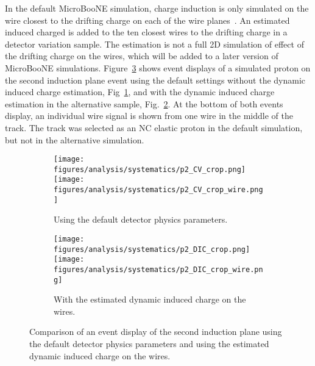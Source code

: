     In the default MicroBooNE simulation, charge induction is only simulated on
    the wire closest to the drifting charge on each of the wire
    planes~\cite{Adams:2018dra}.  An estimated induced charged is added to the
    ten closest wires to the drifting charge in a detector variation sample.
    The estimation is not a full 2D simulation of effect of the drifting charge
    on the wires, which will be added to a later version of MicroBooNE
    simulations. Figure~\ref{fig:dicevd} shows event displays of a simulated
    proton on the second induction plane event using the default settings
    without the dynamic induced charge estimation, Fig~\ref{fig:dicevdcv}, and
    with the dynamic induced charge estimation in the alternative sample,
    Fig.~\ref{fig:dicevddic}. At the bottom of both events display, an
    individual wire signal is shown from one wire in the middle of the track.
    The track was selected as an NC elastic proton in the default simulation,
    but not in the alternative simulation.
    \begin{figure}[h]
      \centering
      \begin{subfigure}[t]{2.8in}
        \texttt{[image: figures/analysis/systematics/p2\_CV\_crop.png]} \\
        \texttt{[image: figures/analysis/systematics/p2\_CV\_crop\_wire.png]}
        \caption{Using the default detector physics parameters.}
        \label{fig:dicevdcv}
      \end{subfigure}
      \hspace{2pt}
      \begin{subfigure}[t]{2.8in}
        \texttt{[image: figures/analysis/systematics/p2\_DIC\_crop.png]} \\
        \texttt{[image: figures/analysis/systematics/p2\_DIC\_crop\_wire.png]}
        \caption{With the estimated dynamic induced charge on the wires.}
        \label{fig:dicevddic}
      \end{subfigure}
      \caption{Comparison of an event display of the second induction plane
      using the default detector physics parameters and using the estimated
      dynamic induced charge on the
      wires.}
      \label{fig:dicevd}
    \end{figure}

